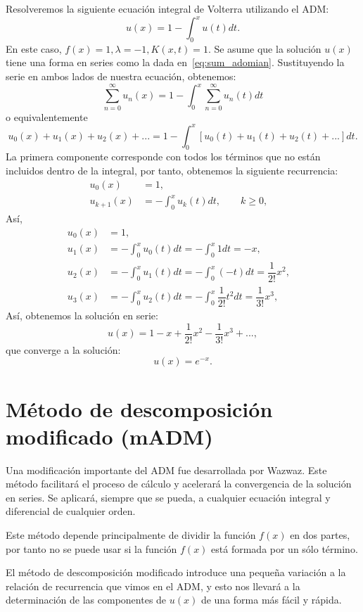 \begin{ejemplo}
	Resolveremos la siguiente ecuación integral de Volterra utilizando el ADM:
	\begin{equation}
		u(x) = 1 - \int_{0}^{x} u(t)dt.
	\end{equation}
	En este caso, $f(x) = 1, \lambda = -1, K(x,t) = 1.$ Se asume que la solución $u(x)$ tiene una forma en series como la dada en~\eqref{eq:sum_adomian}. Sustituyendo la serie en ambos lados de nuestra ecuación, obtenemos:
	\begin{equation}
		\sum_{n=0}^{\infty} u_n(x) = 1 - \int_{0}^{x} \sum_{n=0}^{\infty} u_n(t)dt
	\end{equation}
	o equivalentemente
	\begin{equation}
		u_0(x) + u_1(x) + u_2(x) + ... = 1 - \int_0^x [u_0(t) + u_1(t) + u_2(t) + ...]dt.
	\end{equation}
	La primera componente corresponde con todos los términos que no están incluidos dentro de la integral, por tanto, obtenemos la siguiente recurrencia:
	\begin{align}
		u_0(x) &= 1,      &   \\
		u_{k+1}(x) &= - \int_{0}^{x} u_k(t)dt, \qquad k \geqslant 0,         & 
	\end{align}
	Así,
	\begin{align}
		u_0(x) &= 1,      &   \\
		u_{1}(x) &= - \int_{0}^{x} u_0(t)dt = -\int_{0}^{x} 1dt = -x,    &  \\
		u_{2}(x) &= - \int_{0}^{x} u_1(t)dt = -\int_{0}^{x} (-t)dt = \dfrac{1}{2!}x^2,    &  \\
		u_{3}(x) &= - \int_{0}^{x} u_2(t)dt = -\int_{0}^{x} \dfrac{1}{2!}t^2dt = \dfrac{1}{3!}x^3,    & 
	\end{align}	
	Así, obtenemos la solución en serie:
	\begin{equation}
		u(x) = 1 - x + \dfrac{1}{2!}x^2 - \dfrac{1}{3!}x^3 + ...,
	\end{equation}
	que converge a la solución:
	\begin{equation}
		u(x) = e^{-x}.
	\end{equation}
\end{ejemplo}

\section{Método de descomposición modificado (mADM)}
Una modificación importante del ADM fue desarrollada por Wazwaz. Este método facilitará el proceso de cálculo y acelerará la convergencia de la solución en series. Se aplicará, siempre que se pueda, a cualquier ecuación integral y diferencial de cualquier orden.
\begin{observacion}
	Este método depende principalmente de dividir la función $f(x)$ en dos partes, por tanto no se puede usar si la función $f(x)$ está formada por un sólo término.
\end{observacion}
El método de descomposición modificado introduce una pequeña variación a la relación de recurrencia que vimos en el ADM, y esto nos llevará a la determinación de las componentes de $u(x)$ de una forma más fácil y rápida.

